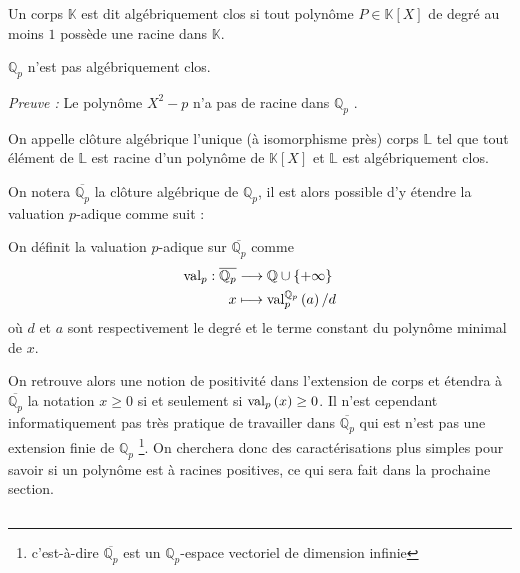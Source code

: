 \begin{definition}
	Un corps $\mathbb{K}$ est dit algébriquement clos si tout polynôme $P\in \mathbb{K}[X]$ de degré au moins $1$ possède une racine dans $\mathbb{K}$.
\end{definition}

\begin{proposition}
	$\mathbb{Q}_{p} $ n'est pas algébriquement clos.
\end{proposition}
\textit{Preuve :} Le polynôme $X^2 - p$ n'a pas de racine dans $\mathbb{Q}_{p}$ \hfill \qedsymbol.

\begin{definition}
	On appelle clôture algébrique l'unique (à isomorphisme près) corps $\mathbb{L}$ tel que tout élément de $\mathbb{L}$ est racine d'un polynôme de $\mathbb{K}[X]$ et $\mathbb{L}$ est algébriquement clos.
\end{definition}

On notera $\overline{\mathbb{Q}_{p} }$ la clôture algébrique de $\mathbb{Q}_{p}$, il est alors possible d'y étendre la valuation $p$-adique comme suit :

\begin{definition}
	On définit la valuation $p$-adique sur $\overline{\mathbb{Q}_{p} }$ comme 
\begin{align*}
	\text{val}_p : \overline{\mathbb{Q}_{p}} & \longrightarrow \mathbb{Q}\cup \{+\infty\} \\
x & \longmapsto \text{val}_p^{\mathbb{Q}_{p} } \left(a\right)/d
\end{align*}
	où $d$ et $a$ sont respectivement le degré et le terme constant du polynôme minimal de $x$.
\end{definition}

On retrouve alors une notion de positivité dans l'extension de corps et étendra à $\overline{\mathbb{Q}_{p}} $ la notation $x\ge 0$ si et seulement si $\text{val}_p\left(x\right)\ge 0$. Il n'est cependant informatiquement pas très pratique de travailler dans $\overline{\mathbb{Q}_{p} }$ qui est n'est pas une extension finie de $\mathbb{Q}_{p} $ \footnote{c'est-à-dire $\overline{\mathbb{Q}_{p} }$ est un $\mathbb{Q}_{p}$-espace vectoriel de dimension infinie }. On cherchera donc des caractérisations plus simples pour savoir si un polynôme est à racines positives, ce qui sera fait dans la prochaine section.

\subsection{\Mats} 

